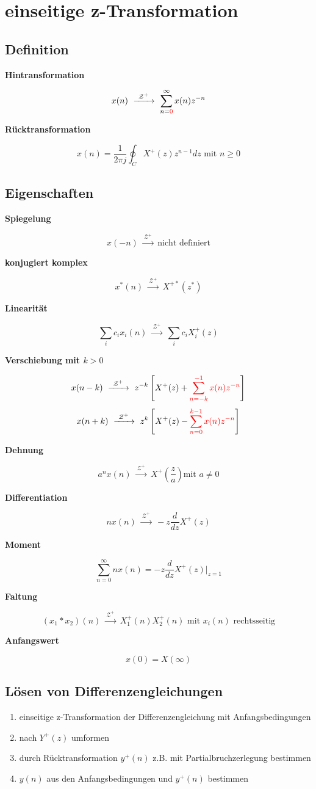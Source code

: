 \documentclass[10pt,a4paper]{article}
\newcommand{\fancyformula}[2]{
	\small\raggedright{\sffamily\textbf{#1}}
	#2
}
\newcommand{\ztransformOneSided}{
	~\xrightarrow{~\mathcal{Z^{+}}~}~
}
\begin{document}
\section*{einseitige z-Transformation}
\subsection*{Definition}
\begin{multicols}{2}
	\fancyformula{Hintransformation}{
	\[x(n) \ztransformOneSided \sum_{n=\textcolor{red}{0}}^{\infty}x(n)z^{-n}\]
	}
	\fancyformula{Rücktransformation}{
	\[x(n)=\frac{1}{2\pi j}\oint_{C}X^{+}(z)z^{n-1}dz \text{ mit }n \geq 0\]
	}
\end{multicols}
\subsection*{Eigenschaften}
\begin{multicols}{2}
	 \fancyformula{Spiegelung}{
 	\[x(-n) \ztransformOneSided \text{nicht definiert}\]
	}
	\fancyformula{konjugiert komplex}{
	\[x^{*}(n) \ztransformOneSided X^{+*}(z^{*})\]
	}
	\fancyformula{Linearität}{
	\[\sum_{i}^{}c_{i}x_{i}(n)\ztransformOneSided \sum_{i}^{}c_{i}X^{+}_{i}(z)\]
	}
	\fancyformula{Verschiebung mit $k>0$}{
	\[x(n-k)\ztransformOneSided z^{-k}\left[X^{+}(z)+\textcolor{red}{\sum_{n=-k}^{-1}x(n)z^{-n}}\right]\]
	\[x(n+k)\ztransformOneSided z^{k}\left[X^{+}(z)-\textcolor{red}{\sum_{n=0}^{k-1}x(n)z^{-n}}\right]\]
	}
	\fancyformula{Dehnung}{
	\[a^{n}x(n)\ztransformOneSided X^{+}\left(\frac{z}{a}\right) \text{mit }a\neq 0\]
	}
	\fancyformula{Differentiation}{
	\[nx(n)\ztransformOneSided -z\frac{d}{dz}X^{+}(z)\]
	}
	\fancyformula{Moment}{
	\[\sum_{n=0}^{\infty}nx(n)=-z\frac{d}{dz}X^{+}(z)|_{z=1}\]
	}
	\fancyformula{Faltung}{
	\[(x_{1}*x_{2})(n)\ztransformOneSided X_{1}^{+}(n)X_{2}^{+}(n) \text{ mit $x_{i}(n)$ rechtsseitig}\]
	}
	\fancyformula{Anfangswert}{
	\[x(0)=X(\infty)\]
	}
\end{multicols}
\subsection*{Lösen von Differenzengleichungen}
\begin{enumerate}
	\item einseitige z-Transformation der Differenzengleichung mit Anfangsbedingungen
	\item nach $Y^{+}(z)$ umformen
	\item durch Rücktransformation $y^{+}(n)$ z.B. mit  Partialbruchzerlegung bestimmen
	\item  $y(n)$ aus den Anfangsbedingungen und $y^{+}(n)$  bestimmen
\end{enumerate}
\end{document}
